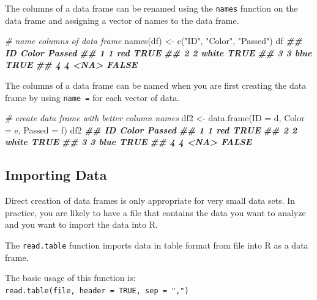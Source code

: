 \documentclass[
]{book}
\newenvironment{Shaded}{\begin{snugshade}}{\end{snugshade}}
\newcommand{\AttributeTok}[1]{\textcolor[rgb]{0.77,0.63,0.00}{#1}}
\newcommand{\CommentTok}[1]{\textcolor[rgb]{0.56,0.35,0.01}{\textit{#1}}}
\newcommand{\DocumentationTok}[1]{\textcolor[rgb]{0.56,0.35,0.01}{\textbf{\textit{#1}}}}
\newcommand{\FunctionTok}[1]{\textcolor[rgb]{0.00,0.00,0.00}{#1}}
\newcommand{\NormalTok}[1]{#1}
\newcommand{\OtherTok}[1]{\textcolor[rgb]{0.56,0.35,0.01}{#1}}
\newcommand{\StringTok}[1]{\textcolor[rgb]{0.31,0.60,0.02}{#1}}
\theoremstyle{definition}
\theoremstyle{definition}
\theoremstyle{definition}
\theoremstyle{definition}
\theoremstyle{remark}
\begin{document}
The columns of a data frame can be renamed using the \texttt{names} function on the data frame and assigning a vector of names to the data frame.

\begin{Shaded}
\begin{Highlighting}[]
\CommentTok{\# name columns of data frame}
\FunctionTok{names}\NormalTok{(df) }\OtherTok{\textless{}{-}} \FunctionTok{c}\NormalTok{(}\StringTok{"ID"}\NormalTok{, }\StringTok{"Color"}\NormalTok{, }\StringTok{"Passed"}\NormalTok{)}
\NormalTok{df}
\DocumentationTok{\#\#   ID Color Passed}
\DocumentationTok{\#\# 1  1   red   TRUE}
\DocumentationTok{\#\# 2  2 white   TRUE}
\DocumentationTok{\#\# 3  3  blue   TRUE}
\DocumentationTok{\#\# 4  4  \textless{}NA\textgreater{}  FALSE}
\end{Highlighting}
\end{Shaded}

The columns of a data frame can be named when you are first creating the data frame by using \texttt{name\ =} for each vector of data.

\begin{Shaded}
\begin{Highlighting}[]
\CommentTok{\# create data frame with better column names}
\NormalTok{df2 }\OtherTok{\textless{}{-}} \FunctionTok{data.frame}\NormalTok{(}\AttributeTok{ID =}\NormalTok{ d, }\AttributeTok{Color =}\NormalTok{ e, }\AttributeTok{Passed =}\NormalTok{ f)}
\NormalTok{df2}
\DocumentationTok{\#\#   ID Color Passed}
\DocumentationTok{\#\# 1  1   red   TRUE}
\DocumentationTok{\#\# 2  2 white   TRUE}
\DocumentationTok{\#\# 3  3  blue   TRUE}
\DocumentationTok{\#\# 4  4  \textless{}NA\textgreater{}  FALSE}
\end{Highlighting}
\end{Shaded}

\hypertarget{importing-data}{%
\subsection{Importing Data}\label{importing-data}}

Direct creation of data frames is only appropriate for very small data sets. In practice, you are likely to have a file that contains the data you want to analyze and you want to import the data into R.

The \texttt{read.table} function imports data in table format from file into R as a data frame.

The basic usage of this function is: \texttt{read.table(file,\ header\ =\ TRUE,\ sep\ =\ ",")}
\end{document}
